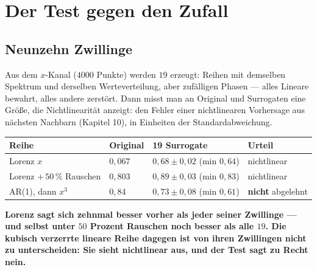 \chapter{Der Test gegen den Zufall}

\section{Neunzehn Zwillinge}

\begin{merksatz}
Aus dem $x$-Kanal ($4000$ Punkte) werden $19$  erzeugt: Reihen mit demselben Spektrum und derselben Werteverteilung, aber zufälligen Phasen --- alles Lineare bewahrt, alles andere zerstört. Dann misst man an Original und Surrogaten eine Größe, die Nichtlinearität anzeigt: den Fehler einer nichtlinearen Vorhersage aus nächsten Nachbarn (Kapitel 10), in Einheiten der Standardabweichung.

\begin{center}
{\small
\renewcommand{\arraystretch}{1.46}
\begin{tabular}{@{}P{3.2cm}P{1.6cm}P{2.6cm}P{1.8cm}@{}}
\toprule
\textbf{Reihe} & \textbf{Original} & \textbf{19 Surrogate} & \textbf{Urteil}\\
\midrule
Lorenz $x$ & $0{,}067$ & $0{,}68 \pm 0{,}02$ (min $0{,}64$) & nichtlinear\\
Lorenz $+\,50\,\%$ Rauschen & $0{,}803$ & $0{,}89 \pm 0{,}03$ (min $0{,}83$) & nichtlinear\\
AR(1), dann $x^{3}$ & $0{,}84$ & $0{,}73 \pm 0{,}08$ (min $0{,}61$) & \textbf{nicht} abgelehnt\\
\bottomrule
\end{tabular}}
\end{center}

\begin{center}
\begin{minipage}{0.9\textwidth}
\textbf{Lorenz sagt sich zehnmal besser vorher als jeder seiner Zwillinge --- und selbst unter $50$ Prozent Rauschen noch besser als alle $19$. Die kubisch verzerrte lineare Reihe dagegen ist von ihren Zwillingen nicht zu unterscheiden: Sie sieht nichtlinear aus, und der Test sagt zu Recht nein.}
\end{minipage}
\end{center}

\begin{center}
\begin{minipage}{0.88\textwidth}
\end{minipage}
\end{center}
\end{merksatz}

